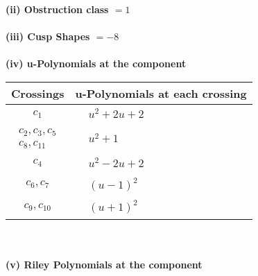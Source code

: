 \documentclass[1p]{elsarticle_modified}
\theoremstyle{definition}
\begin{document}
\flushleft \textbf{(ii) Obstruction class $= 1$}\\~\\
\flushleft \textbf{(iii) Cusp Shapes $= -8$}\\~\\
\newpage\renewcommand{\arraystretch}{1}
\flushleft \textbf{(iv) u-Polynomials at the component}\newline \\
\begin{tabular}{m{50pt}|m{274pt}}
Crossings & \hspace{64pt}u-Polynomials at each crossing \\
\hline $$\begin{aligned}c_{1}\end{aligned}$$&$\begin{aligned}
&u^2+2 u+2
\end{aligned}$\\
\hline $$\begin{aligned}c_{2},c_{3},c_{5}\\c_{8},c_{11}\end{aligned}$$&$\begin{aligned}
&u^2+1
\end{aligned}$\\
\hline $$\begin{aligned}c_{4}\end{aligned}$$&$\begin{aligned}
&u^2-2 u+2
\end{aligned}$\\
\hline $$\begin{aligned}c_{6},c_{7}\end{aligned}$$&$\begin{aligned}
&(u-1)^2
\end{aligned}$\\
\hline $$\begin{aligned}c_{9},c_{10}\end{aligned}$$&$\begin{aligned}
&(u+1)^2
\end{aligned}$\\
\hline
\end{tabular}\\~\\
\newpage\renewcommand{\arraystretch}{1}
\flushleft \textbf{(v) Riley Polynomials at the component}\newline \\
\end{document}
